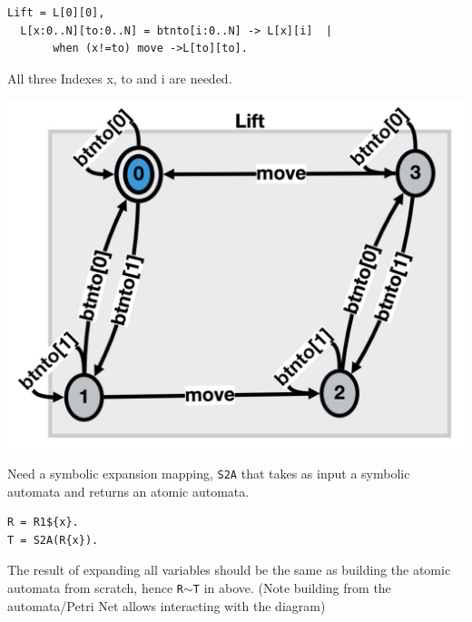 \documentclass[]{article}
\begin{document}
\vspace{1em} \begin{minipage}{0.55\textwidth}
\begin{verbatim}
Lift = L[0][0],
  L[x:0..N][to:0..N] = btnto[i:0..N] -> L[x][i]  |
       when (x!=to) move ->L[to][to]. 
  \end{verbatim} 
  
All three Indexes {\sf x}, {\sf to} and {\sf i}  are needed.
\end{minipage}
\begin{minipage}{0.4\textwidth}
\begin{center}\includegraphics[scale=0.12]{Lix.jpg}\end{center}
\end{minipage}
 


Need a symbolic expansion mapping,  \verb|S2A|  that takes as input a symbolic  automata and returns an atomic automata.




\begin{center}
\begin{minipage}{0.3\textwidth}
\begin{verbatim}
R = R1${x}.
T = S2A(R{x}).
\end{verbatim} 
\end{minipage}
\end{center}
 
The result of expanding all variables should be the same as building the atomic automata from  scratch, hence \verb|R|$\sim$\verb|T| in above. (Note building from the automata/Petri Net allows interacting with the diagram)  
\end{document}
